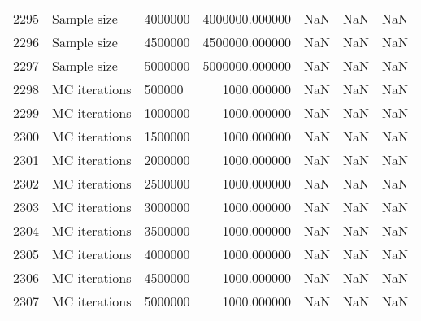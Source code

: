\begin{tabular}{lllrrrr}
2295 & Sample size & 4000000 & 4000000.000000 & NaN & NaN & NaN \\
2296 & Sample size & 4500000 & 4500000.000000 & NaN & NaN & NaN \\
2297 & Sample size & 5000000 & 5000000.000000 & NaN & NaN & NaN \\
2298 & MC iterations & 500000 & 1000.000000 & NaN & NaN & NaN \\
2299 & MC iterations & 1000000 & 1000.000000 & NaN & NaN & NaN \\
2300 & MC iterations & 1500000 & 1000.000000 & NaN & NaN & NaN \\
2301 & MC iterations & 2000000 & 1000.000000 & NaN & NaN & NaN \\
2302 & MC iterations & 2500000 & 1000.000000 & NaN & NaN & NaN \\
2303 & MC iterations & 3000000 & 1000.000000 & NaN & NaN & NaN \\
2304 & MC iterations & 3500000 & 1000.000000 & NaN & NaN & NaN \\
2305 & MC iterations & 4000000 & 1000.000000 & NaN & NaN & NaN \\
2306 & MC iterations & 4500000 & 1000.000000 & NaN & NaN & NaN \\
2307 & MC iterations & 5000000 & 1000.000000 & NaN & NaN & NaN \\
\bottomrule
\end{tabular}
